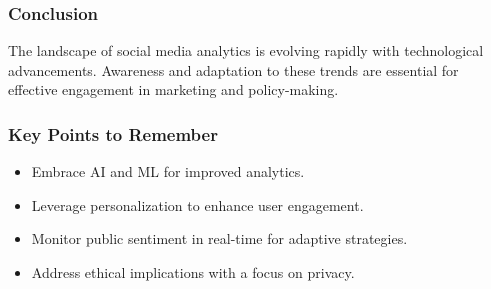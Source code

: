 \documentclass{beamer}
\begin{document}
\begin{frame}[fragile]
    \frametitle{Conclusion}
    The landscape of social media analytics is evolving rapidly with technological advancements. Awareness and adaptation to these trends are essential for effective engagement in marketing and policy-making.
\end{frame}

\begin{frame}[fragile]
    \frametitle{Key Points to Remember}
    \begin{itemize}
        \item Embrace AI and ML for improved analytics.
        \item Leverage personalization to enhance user engagement.
        \item Monitor public sentiment in real-time for adaptive strategies.
        \item Address ethical implications with a focus on privacy.
    \end{itemize}
\end{frame}
\end{document}
